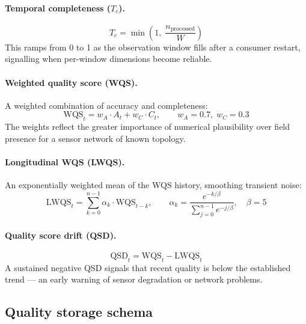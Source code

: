 \paragraph{Temporal completeness ($T_c$).}
\begin{equation}
  T_c = \min\!\left(1,\; \frac{n_{\text{processed}}}{W}\right)
  \label{eq:temporal-completeness}
\end{equation}
This ramps from 0 to 1 as the observation window fills after a consumer
restart, signalling when per-window dimensions become reliable.

\paragraph{Weighted quality score (WQS).}
A weighted combination of accuracy and completeness:
\begin{equation}
  \text{WQS}_t = w_A \cdot A_t + w_C \cdot C_t, \qquad w_A = 0.7,\; w_C = 0.3
  \label{eq:wqs}
\end{equation}
The weights reflect the greater importance of numerical plausibility
over field presence for a sensor network of known topology.

\paragraph{Longitudinal WQS (LWQS).}
An exponentially weighted mean of the WQS history, smoothing transient
noise:
\begin{equation}
  \text{LWQS}_t = \sum_{k=0}^{n-1} \alpha_k \cdot \text{WQS}_{t-k},
  \qquad
  \alpha_k = \frac{e^{-k/\beta}}{\sum_{j=0}^{n-1} e^{-j/\beta}},
  \quad \beta = 5
  \label{eq:lwqs}
\end{equation}

\paragraph{Quality score drift (QSD).}
\begin{equation}
  \text{QSD}_t = \text{WQS}_t - \text{LWQS}_t
  \label{eq:qsd}
\end{equation}
A sustained negative QSD signals that recent quality is below the
established trend — an early warning of sensor degradation or network
problems.

\subsection{Quality storage schema}
\label{subsec:quality-schema}

